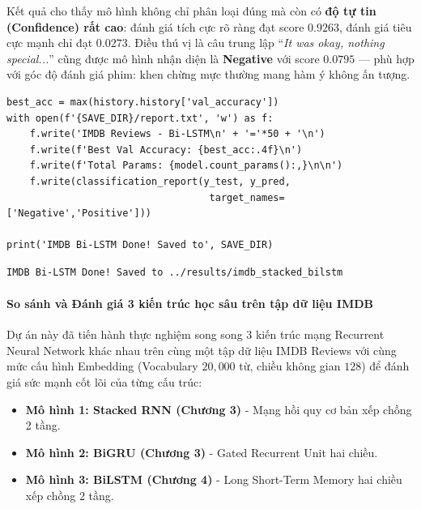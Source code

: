 Kết quả cho thấy mô hình không chỉ phân loại đúng mà còn có \textbf{độ tự tin (Confidence) rất cao}: đánh giá tích cực rõ ràng đạt score $0.9263$, đánh giá tiêu cực mạnh chỉ đạt $0.0273$. Điều thú vị là câu trung lập ``\textit{It was okay, nothing special...}'' cũng được mô hình nhận diện là \textbf{Negative} với score $0.0795$ --- phù hợp với góc độ đánh giá phim: khen chừng mực thường mang hàm ý không ấn tượng.

\begin{lstlisting}[style=pythoncode, caption={Lưu báo cáo thực nghiệm}]
best_acc = max(history.history['val_accuracy'])
with open(f'{SAVE_DIR}/report.txt', 'w') as f:
    f.write('IMDB Reviews - Bi-LSTM\n' + '='*50 + '\n')
    f.write(f'Best Val Accuracy: {best_acc:.4f}\n')
    f.write(f'Total Params: {model.count_params():,}\n\n')
    f.write(classification_report(y_test, y_pred,
                                   target_names=['Negative','Positive']))

print('IMDB Bi-LSTM Done! Saved to', SAVE_DIR)
\end{lstlisting}

\begin{lstlisting}[style=consoleoutput, caption={Output: Hoàn thành thực nghiệm}]
IMDB Bi-LSTM Done! Saved to ../results/imdb_stacked_bilstm
\end{lstlisting}

\paragraph{So sánh và Đánh giá 3 kiến trúc học sâu trên tập dữ liệu IMDB} \hfill\mbox{}

Dự án này đã tiến hành thực nghiệm song song 3 kiến trúc mạng Recurrent Neural Network khác nhau trên cùng một tập dữ liệu IMDB Reviews với cùng mức cấu hình Embedding (Vocabulary $20{,}000$ từ, chiều không gian $128$) để đánh giá sức mạnh cốt lõi của từng cấu trúc:

\begin{itemize}
    \item \textbf{Mô hình 1: Stacked RNN (Chương 3)} - Mạng hồi quy cơ bản xếp chồng 2 tầng.
    \item \textbf{Mô hình 2: BiGRU (Chương 3)} - Gated Recurrent Unit hai chiều.
    \item \textbf{Mô hình 3: BiLSTM (Chương 4)} - Long Short-Term Memory hai chiều xếp chồng 2 tầng.
\end{itemize}

